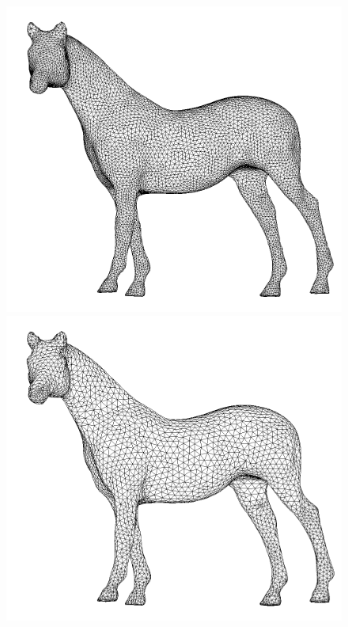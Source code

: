 \documentclass[letter,11pt]{article}
\begin{document}
\begin{figure}
\begin{minipage}{.40\textwidth}
    \includegraphics[width=1\linewidth]{../image/horse_c.png}
  \end{minipage}
  \begin{minipage}{.40\textwidth}
    \centering
    \includegraphics[width=1\linewidth]{../image/horse_b.png}
  \end{minipage} 
  \begin{minipage}{0.40\textwidth}

\end{minipage}
\end{figure}
\end{document}
